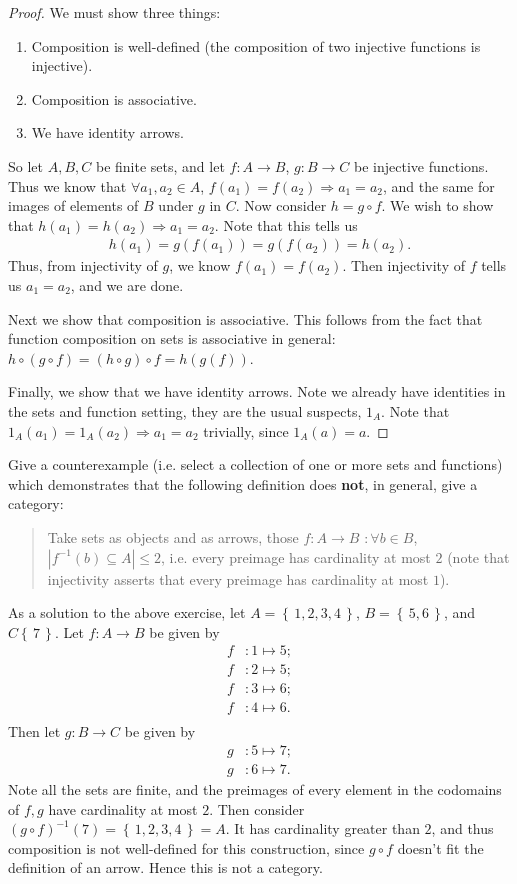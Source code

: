 \documentclass[12pt, reqno]{amsart}
\theoremstyle{definition}
\theoremstyle{definition}
\numberwithin{theorem}{section}
\theoremstyle{plain}
\theoremstyle{definition}
\theoremstyle{remark}
\newcommand{\sub}{\subseteq}				%
\newcommand{\bee}{\begin{equation}\begin{aligned}}
\newcommand{\eee}{\end{aligned}\end{equation}}
\renewcommand{\leq}{\leqslant}			%
\renewcommand{\'}{\hspace{0.5mm}'}			%
\renewcommand{\Set}[1]{\left\{\,#1\,\right\}}	%
\begin{document}
\begin{proof}
	We must show three things:
	\begin{enumerate}
		\item Composition is well-defined (the composition of two injective functions is injective).
		\item Composition is associative. 
		\item We have identity arrows. 
	\end{enumerate}
	So let $A,B,C$ be finite sets, and let $f:A \to B$, $g:B \to C$
	be injective functions. Thus we know that $\forall a_1,a_2 \in A$, $f(a_1) = f(a_2) \Rightarrow a_1 = a_2$, and the same for images of elements of $B$ under $g$ in $C$. Now consider $h = g \circ f$. We wish to show that $h(a_1) = h(a_2) \Rightarrow a_1 = a_2$. Note that this tells us
\bee
	h(a_1) = g(f(a_1)) = g(f(a_2)) = h(a_2). 
\eee
Thus, from injectivity of $g$, we know $f(a_1) = f(a_2)$. Then injectivity of $f$ tells us $a_1 = a_2$, and we are done. 

Next we show that composition is associative. This follows from the fact that function composition on sets is associative in general: $h \circ (g \circ f) = (h \circ g) \circ f = h(g(f))$. 

Finally, we show that we have identity arrows. Note we already have identities in the sets and function setting, they are the usual suspects, $1_A$. Note that $1_A(a_1) = 1_A(a_2) \Rightarrow a_1 = a_2$ trivially, since $1_A(a) = a$. 
\end{proof}

\begin{e}
	Give a counterexample (i.e. select a collection of one or more sets and functions) which demonstrates that the following definition does \textbf{not}, in general, give a category:
	
	\begin{quote}
		Take sets as objects and as arrows, those $f:A \to B$ $:\forall b \in B$, $|f^{-1}(b) \sub A| \leq 2$, i.e. every preimage has cardinality at most $2$ (note that injectivity asserts that every preimage has cardinality at most $1$). 
	\end{quote}
\end{e}

As a solution to the above exercise, let $A = \Set{1,2,3,4}$, $B = \Set{5,6}$, and $C \Set{7}$. Let $f:A \to B$ be given by 
\bee
f&:1 \mapsto 5; \\
f&:2 \mapsto 5; \\
f&:3 \mapsto 6; \\
f&:4 \mapsto 6. \\
\eee
Then let $g:B \to C$ be given by 
\bee
g&: 5 \mapsto 7; \\
g&: 6 \mapsto 7.
\eee
Note all the sets are finite, and the preimages of every element in the codomains of $f,g$ have cardinality at most $2$. Then consider $(g \circ f)^{-1}(7) = \Set{1,2,3,4} = A$. It has cardinality greater than $2$, and thus composition is not well-defined for this construction, since $g \circ f$ doesn't fit the definition of an arrow. Hence this is not a category. 
\end{document}
